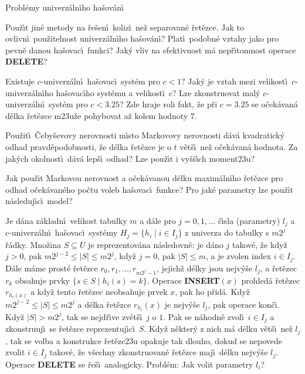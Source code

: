 \documentclass[a4paper,12pt]{article}
\begin{document}
\subhead
Probl\'emy univerz\'aln\'\i ho ha\v sov\'an\'\i
\endsubhead
\smallskip

\flushpar Pou\v z\'\i t jin\'e metody na \v re\v sen\'\i\ koliz\'\i\ ne\v z 
separovan\'e \v ret\v ezce. Jak to ovlivn\'\i\ pou\v zitelnost 
univerz\'aln\'\i ho ha\v sov\'an\'\i ? Plat\'\i\ podobn\'e vztahy jako pro 
pevn\v e danou ha\v sovac\'\i\ funkci? Jak\'y vliv na efektivnost 
m\'a nep\v r\'\i tomnost operace {\bf DELETE}?
\medskip

\flushpar Existuje $c$-univerz\'aln\'\i\ ha\v sovac\'\i\ syst\'em pro 
$c<1$? Jak\'y je vztah mezi velikost\'\i\ $c$-univerz\'aln\'\i\-ho 
ha\v sovac\'\i ho syst\'emu a velikost\'\i\ $c$? Lze zkonstruovat 
mal\'y $c$-univerz\'aln\'\i\ syst\'em pro $c<3.25$? Zde hraje roli 
fakt, \v ze p\v ri $c=3.25$ se o\v cek\'avan\'a d\'elka \v ret\v ezce 
m\accent23u\v ze pohybovat a\v z kolem hodnoty $7$.
\medskip

\flushpar Pou\v zit\'\i\ \v Ceby\v sevovy nerovnosti m\'\i sto 
Markovovy nerovnosti d\'av\'a kvadratick\'y odhad 
prav\-d\v e\-podobnosti, \v ze d\'elka \v ret\v ezce je o $t$ v\v et\v s\'\i\ ne\v z 
o\v cek\'avan\'a hodnota. Za jak\'ych okolnost\'\i\ d\'av\'a lep\v s\'\i\ 
odhad? Lze pou\v z\'\i t i vy\v s\v s\'\i ch moment\accent23u?
\medskip

\flushpar Jak pou\v z\'\i t Markovou nerovnost a o\v cek\'avanou 
d\'elku maxim\'al\-n\'\i\-ho \v ret\v ezce pro odhad o\v cek\'a\-va\-n\'eho 
po\v ctu voleb ha\v sovac\'\i\ funk\-ce? 
Pro jak\'e parametry lze pou\v z\'\i t n\'asleduj\'\i c\'\i\ model?

\flushpar Je d\'ana z\'akladn\'\i\ velikost tabulky $m$ a d\'ale pro $
j=0,1,\dots$ 
\v c\'\i sla (parametry) $l_j$ a $c$-univer\-z\'al\-n\'\i\ ha\v sovac\'\i\ syst\'emy 
$H_j=\{h_i\mid i\in I_j\}$ z univerza do tabulky s $m2^j$ \v r\'adky.\newline 
Mno\v zina $S\subseteq U$ je reprezentov\'ana n\'asledovn\v e:  je d\'ano $
j$ 
tako\-v\'e, \v ze kdy\v z $j>0$, pak $m2^{j-2}\le |S|\le m2^j$, kdy\v z $
j=0$, pak 
$|S|\le m$, a je zvolen index $i\in I_j$.  D\'ale m\'ame prost\'e \v ret\v ezce 
$r_0,r_1,\dots,r_{m2^j-1}$, jejich\v z d\'elky jsou nejv\'y\v se $
l_j$, a \v ret\v ezec $r_k$ 
obsahuje prvky $\{s\in S\mid h_i(s)=k\}$.\newline 
Operace {\bf INSERT$(x)$} prohled\'a \v ret\v ezec $r_{h_i(x)}$ a kdy\v z tento 
\v re\-t\v e\-zec neobsahuje prvek $x$, pak ho p\v rid\'a.  Kdy\v z 
$m2^{j-2}\le |S|\le m2^j$ a d\'elka \v ret\v ezce $r_{h_i}(x)$ je nejv\'y\v se $
l_j$, pak 
operace kon\v c\'\i .  Kdy\v z $|S|>m2^j$, tak se nejd\v r\'\i ve zv\v et\v s\'\i\ $
j$ o $1$.  
Pak se n\'ahodn\v e zvol\'\i\ $i\in I_j$ a zkonstruuj\'\i\ se \v ret\v ezce 
reprezentuj\'\i c\'\i\ $S$.  Kdy\v z n\v ekter\'y z nich m\'a d\'elku v\v et\v s\'\i\ ne\v z $
l_j$, 
tak se volba a konstrukce \v ret\v ezc\accent23u opakuje tak dlouho, 
dokud se nepovede zvolit $i\in I_j$ takov\'e, \v ze v\v sechny 
zkonstruovan\'e \v ret\v ezce maj\'\i\ d\'elku nejv\'y\v se $l_j$.  Operace {\bf DELETE }
se \v re\v s\'\i\ analogicky.\newline 
Probl\'em:  Jak volit parametry $l_i$?  
\medskip
\end{document}
